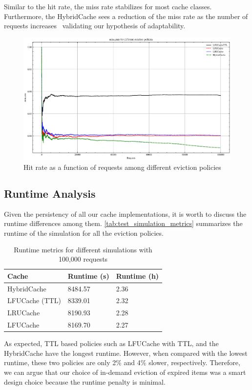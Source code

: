 Similar to the hit rate, the miss rate stabilizes
for most cache classes. Furthermore, the HybridCache
sees a reduction of the miss rate as the
number of requests increases \textemdash~validating
our hypothesis of adaptability.

\begin{figure}[!htp]
    \centering
    \includegraphics[width=\textwidth]{images/miss_rate_plot.eps} %
    \caption{Hit rate as a function of requests among different eviction policies}
    \label{fig:miss_rate_plot}
\end{figure}

\subsection{Runtime Analysis}
Given the persistency of all our cache implementations,
it is worth to discuss the runtime differences among
them. \autoref{tab:test_simulation_metrics} summarizes
the runtime of the simulation for all the eviction policies.

\begin{table}[!htp]
    \centering
    \caption{Runtime metrics for different simulations with 100,000 requests}
    \label{tab:test_simulation_metrics}
    \begin{tabularx}{\linewidth}{XXX}
        \toprule
        \textbf{Cache} & \textbf{Runtime (s)} & \textbf{Runtime (h)} \\
        \midrule
        HybridCache & 8484.57 & 2.36 \\
        LFUCache (TTL) & 8339.01 & 2.32 \\
        LRUCache & 8190.93 & 2.28 \\
        LFUCache & 8169.70 & 2.27 \\
        \bottomrule
    \end{tabularx}
\end{table}

As expected, TTL based policies such as LFUCache with TTL,
and the HybridCache have the longest runtime. However,
when compared with the lowest runtime, these two
policies are only 2\% and 4\% slower, respectively.
Therefore, we can argue that our choice of in-demand
eviction of expired items was a smart design choice
because the runtime penalty is minimal.
